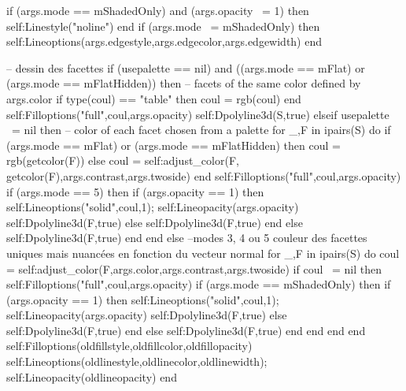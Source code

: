 \documentclass[12pt]{standalone}
\begin{document}
\begin{luacode*}
    if (args.mode == mShadedOnly) and (args.opacity ~= 1)  then self:Linestyle("noline") end
    if (args.mode ~= mShadedOnly) then self:Lineoptions(args.edgestyle,args.edgecolor,args.edgewidth) end
    
    -- dessin des facettes
    if (usepalette == nil) and ((args.mode == mFlat) or (args.mode == mFlatHidden)) then -- facets of the same color defined by args.color
        if type(coul) == "table" then coul = rgb(coul) end
        self:Filloptions("full",coul,args.opacity)
        self:Dpolyline3d(S,true)
    elseif usepalette ~= nil then  -- color of each facet chosen from a palette
        for _,F in ipairs(S) do
            if (args.mode == mFlat) or (args.mode == mFlatHidden) then
                coul = rgb(getcolor(F))
            else
                coul = self:adjust_color(F, getcolor(F),args.contrast,args.twoside)
            end
            self:Filloptions("full",coul,args.opacity)
            if (args.mode == 5) then 
                if (args.opacity == 1) then
                    self:Lineoptions("solid",coul,1); self:Lineopacity(args.opacity)
                    self:Dpolyline3d(F,true)
                else
                    self:Dpolyline3d(F,true)
                end
            else
                self:Dpolyline3d(F,true)
            end
        end
    else --modes 3, 4 ou 5 couleur des facettes uniques mais nuancées en fonction du vecteur normal
        for _,F in ipairs(S) do
            coul = self:adjust_color(F,args.color,args.contrast,args.twoside)
            if coul ~= nil then
                self:Filloptions("full",coul,args.opacity)
                if (args.mode == mShadedOnly) then 
                    if (args.opacity == 1) then
                        self:Lineoptions("solid",coul,1); self:Lineopacity(args.opacity)
                        self:Dpolyline3d(F,true)
                    else
                        self:Dpolyline3d(F,true)
                    end
                else
                    self:Dpolyline3d(F,true)
                end
            end
        end
    end
    self:Filloptions(oldfillstyle,oldfillcolor,oldfillopacity)
    self:Lineoptions(oldlinestyle,oldlinecolor,oldlinewidth); 
    self:Lineopacity(oldlineopacity)
end


\end{luacode*}
\end{document}
